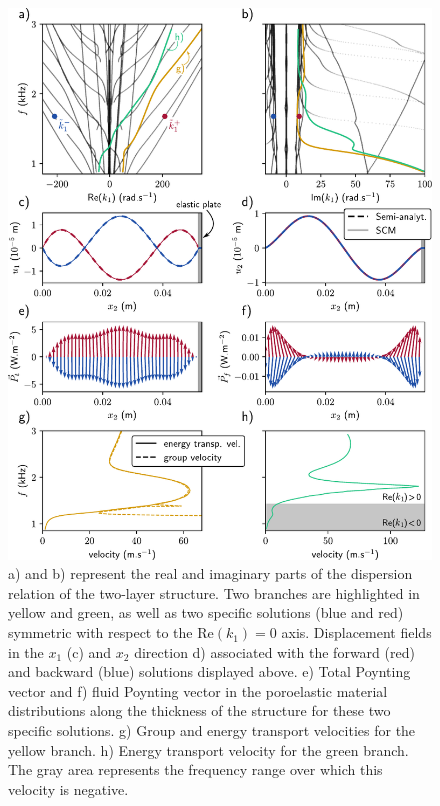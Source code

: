     \begin{figure}
        \centering
        \includegraphics[scale=.9]{chapitres/article_JAP/figures/mode_shapes.pdf}
        \caption{a) and b) represent the real and imaginary parts of the dispersion relation of the two-layer structure. Two branches are highlighted in yellow and green, as well as two specific solutions (blue and red) symmetric with respect to the $\textrm{Re}\left( k_1\right)=0$ axis. Displacement fields in the $x_1$ (c) and $x_2$ direction d) associated with the forward (red) and backward (blue) solutions displayed above. e) Total Poynting vector and f) fluid Poynting vector in the poroelastic material distributions along the thickness of the structure for these two specific solutions. g) Group and energy transport velocities for the yellow branch. h) Energy transport velocity for the green branch. The gray area represents the frequency range over which this velocity is negative.}
        \label{fig:results}
    \end{figure}


